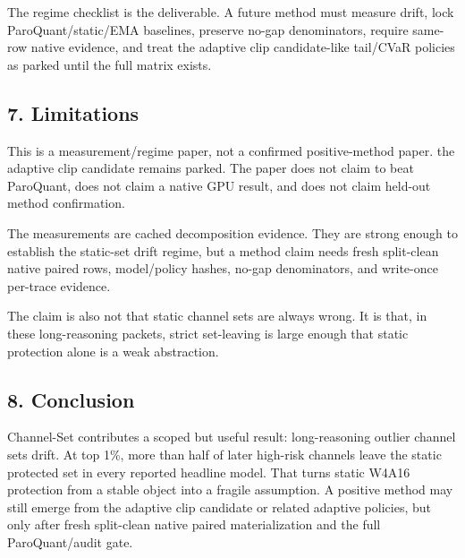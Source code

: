 \documentclass{article}
\begin{document}
The regime checklist is the deliverable. A future method must measure
drift, lock ParoQuant/static/EMA baselines, preserve no-gap
denominators, require same-row native evidence, and treat the adaptive
clip candidate-like tail/CVaR policies as parked until the full matrix
exists.

\hypertarget{limitations}{%
\subsection{7. Limitations}\label{limitations}}

This is a measurement/regime paper, not a confirmed positive-method
paper. the adaptive clip candidate remains parked. The paper does not
claim to beat ParoQuant, does not claim a native GPU result, and does
not claim held-out method confirmation.

The measurements are cached decomposition evidence. They are strong
enough to establish the static-set drift regime, but a method claim
needs fresh split-clean native paired rows, model/policy hashes, no-gap
denominators, and write-once per-trace evidence.

The claim is also not that static channel sets are always wrong. It is
that, in these long-reasoning packets, strict set-leaving is large
enough that static protection alone is a weak abstraction.

\hypertarget{conclusion}{%
\subsection{8. Conclusion}\label{conclusion}}

Channel-Set contributes a scoped but useful result: long-reasoning
outlier channel sets drift. At top 1\%, more than half of later
high-risk channels leave the static protected set in every reported
headline model. That turns static W4A16 protection from a stable object
into a fragile assumption. A positive method may still emerge from the
adaptive clip candidate or related adaptive policies, but only after
fresh split-clean native paired materialization and the full
ParoQuant/audit gate.




\end{document}
